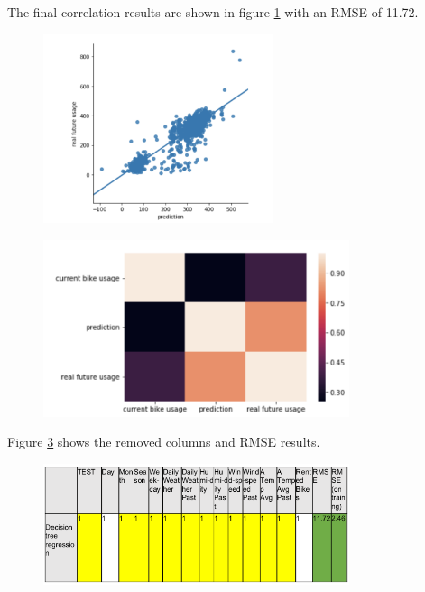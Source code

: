 The final correlation results are shown in figure \ref{fig:image34} with an RMSE of 11.72.
\begin{figure}[H]
\centering
\includegraphics[width=0.6\textwidth]{media/image34}\label{fig:image34}
\label{fig:image34}
\end{figure}
\begin{figure}[H]
\centering
\includegraphics[width=0.8\textwidth]{media/image18}\label{fig:image18}
\label{fig:image18}
\end{figure}
Figure \ref{fig:anasst4} shows the removed columns and RMSE results.
\begin{figure}[H]
\centering
\includegraphics[width=0.8\textwidth]{media/anasst4}\label{fig:anasst4}
\label{fig:anasst4}
\end{figure}

